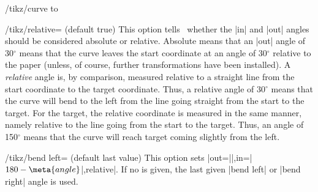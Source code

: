 \begin{key}{/tikz/curve to}
    \begin{key}{/tikz/relative= (default true)}
        This option tells \tikzname\ whether the |in| and |out| angles should
        be considered absolute or relative. Absolute means that an |out| angle
        of 30$^\circ$ means that the curve leaves the start coordinate at an
        angle of 30$^\circ$ relative to the paper (unless, of course, further
        transformations have been installed). A \emph{relative} angle is, by
        comparison, measured relative to a straight line from the start
        coordinate to the target coordinate. Thus, a relative angle of
        30$^\circ$ means that the curve will bend to the left from the line
        going straight from the start to the target. For the target, the
        relative coordinate is measured in the same manner, namely relative to
        the line going from the start to the target. Thus, an angle of
        150$^\circ$ means that the curve will reach target coming slightly from
        the left.
\begin{codeexample}[]
\end{codeexample}

\begin{codeexample}[]
\end{codeexample}
    \end{key}

    \begin{key}{/tikz/bend left= (default \normalfont last value)}
        This option sets |out=||,in=|$180-\meta{angle}$|,relative|.
        If no  is given, the last given |bend left| or |bend right|
        angle is used.
\begin{codeexample}[]
\end{codeexample}
\end{key}
\end{key}
